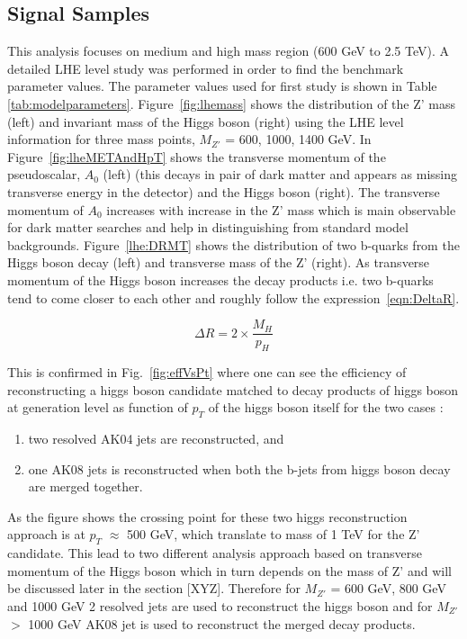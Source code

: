\subsection{Signal Samples \label{sec:sigSamp}}
This analysis focuses on medium and high mass region (600 GeV to 2.5 TeV). A detailed LHE level study was performed in order to find the benchmark parameter values. The parameter 
values used for first study is shown in Table \ref{tab:modelparameters}. Figure~\ref{fig:lhemass} shows the distribution of the Z' mass (left) and invariant mass of the Higgs 
boson (right) using the LHE level information for three mass points, $M_{Z'}$ = 600, 1000, 1400 GeV. In Figure~\ref{fig:lheMETAndHpT} shows the transverse momentum of the 
pseudoscalar, $A_{0}$ (left) (this decays in pair of dark matter and appears as missing transverse energy in the detector) and the Higgs boson (right). The transverse 
momentum of $A_{0}$ increases with increase in the Z' mass which is main observable for dark matter searches and help in distinguishing from standard model backgrounds. 
Figure~\ref{lhe:DRMT} shows the distribution of two b-quarks from the Higgs boson decay (left) and transverse mass of the Z' (right). As transverse momentum of the Higgs boson 
increases the decay products i.e. two b-quarks tend to come closer to each other and roughly follow the expression~\ref{eqn:DeltaR}.

\begin{equation}   
\Delta R = 2 \times \frac{M_{H}}{p_{H}}
\label{eqn:DeltaR} 
\end{equation}

This is confirmed in  Fig.~\ref{fig:effVsPt} where one can see the efficiency of reconstructing a higgs boson candidate matched to decay products of higgs boson at 
generation level as function of $p_{T}$ of the higgs boson itself for the two cases : 
\begin{enumerate}
\item  two resolved AK04 jets are reconstructed, and
\item  one AK08 jets is reconstructed when both the b-jets from higgs boson decay are merged together. 
\end{enumerate}
As the figure shows the crossing point for these two higgs reconstruction approach is at $p_{T}$ $\approx$ 500 GeV, which translate to  mass of 1 TeV for the Z' candidate.
 This lead to two different analysis 
approach based on transverse momentum of the Higgs boson which in turn depends on the mass of Z' and will be discussed later in the section [XYZ]. Therefore for $M_{Z'}$ = 600 GeV,
 800 GeV and 1000 GeV 2 resolved jets are used to reconstruct the higgs boson and for $M_{Z'}$ $>$ 1000 GeV AK08 jet is used to reconstruct the merged decay products. 


